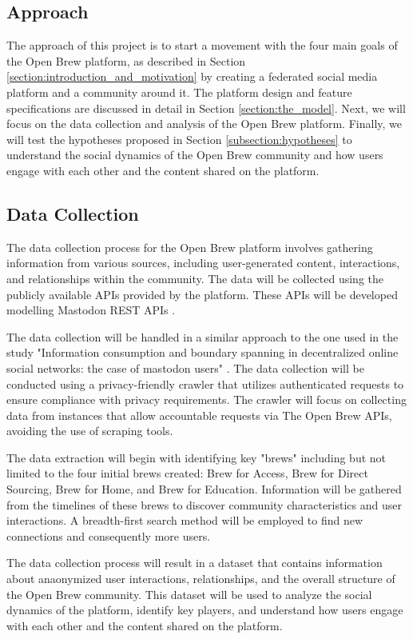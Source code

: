 \documentclass[12pt]{article}
\begin{document}
\subsection{Approach}
\label{subsection:approach}
The approach of this project is to start a movement with the four main goals of the Open Brew platform, as described in Section \ref{section:introduction_and_motivation} by creating a federated social media platform and a community around it. The platform design and feature specifications are discussed in detail in Section \ref{section:the_model}. Next, we will focus on the data collection and analysis of the Open Brew platform. Finally, we will test the hypotheses proposed in Section \ref{subsection:hypotheses} to understand the social dynamics of the Open Brew community and how users engage with each other and the content shared on the platform.

\subsection{Data Collection}
\label{subsection:data_collection}
The data collection process for the Open Brew platform involves gathering information from various sources, including user-generated content, interactions, and relationships within the community. The data will be collected using the publicly available APIs provided by the platform. These APIs will be developed modelling Mastodon REST APIs \cite{mastodonAPI}.

The data collection will be handled in a similar approach to the one used in the study "Information consumption and boundary spanning in decentralized online social networks: the case of mastodon users" \cite{la2022information}. The data collection will be conducted using a privacy-friendly crawler that utilizes authenticated requests to ensure compliance with privacy requirements. The crawler will focus on collecting data from instances that allow accountable requests via The Open Brew APIs, avoiding the use of scraping tools.

The data extraction will begin with identifying key "brews" including but not limited to the four initial brews created: Brew for Access, Brew for Direct Sourcing, Brew for Home, and Brew for Education. Information will be gathered from the timelines of these brews to discover community characteristics and user interactions. A breadth-first search method will be employed to find new connections and consequently more users.

The data collection process will result in a dataset that contains information about anaonymized user interactions, relationships, and the overall structure of the Open Brew community. This dataset will be used to analyze the social dynamics of the platform, identify key players, and understand how users engage with each other and the content shared on the platform.
\end{document}
